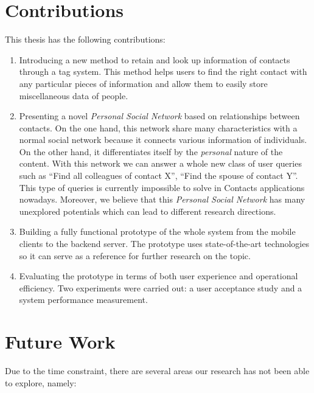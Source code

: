 \section{Contributions}
This thesis has the following contributions:

\begin{enumerate}
    \item Introducing a new method to retain and look up information of contacts through a tag system. This method helps users to find the right contact with any particular pieces of information and allow them to easily store miscellaneous data of people.
    \item Presenting a novel \textit{Personal Social Network} based on relationships between contacts. On the one hand, this network share many characteristics with a normal social network because it connects various information of individuals. On the other hand, it differentiates itself by the \textit{personal} nature of the content. With this network we can answer a whole new class of user queries such as ``Find all colleagues of contact X'', ``Find the spouse of contact Y''. This type of queries is currently impossible to solve in Contacts applications nowadays. Moreover, we believe that this \textit{Personal Social Network} has many unexplored potentials which can lead to different research directions.
    \item Building a fully functional prototype of the whole system from the mobile clients to the backend server. The prototype uses state-of-the-art technologies so it can serve as a reference for further research on the topic.
    \item Evaluating the prototype in terms of both user experience and operational efficiency. Two experiments were carried out: a user acceptance study and a system performance measurement.
\end{enumerate}

\section{Future Work}
Due to the time constraint, there are several areas our research has not been able to explore, namely:


